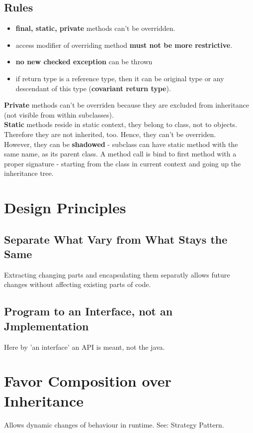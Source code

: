 \documentclass{report}
\begin{document}
\section*{Rules}
\begin{itemize}
	\item \textbf{final, static, private} methods can't be overridden.
	\item access modifier of overriding method \textbf{must not be more restrictive}.
	\item \textbf{no new checked exception} can be thrown
	\item if return type is a reference type, then it can be original type or any descendant of this type (\textbf{covariant return type}).
\end{itemize}

\textbf{Private} methods can't be overriden because they are excluded from inheritance (not visible from within subclasses). \\
\textbf{Static} methods reside in static context, they belong to class, not to objects. Therefore they are not inherited, too. Hence, they can't be overriden. \\
However, they can be \textbf{shadowed} - subclass can have static method with the same name, as its parent class. A method call is bind to first method with a proper signature - starting 
from the class in current context and going up the inheritance tree.



\chapter{Design Principles}


\section{Separate What Vary from What Stays the Same}
Extracting changing parts and encapsulating them separatly allows future changes without affecting existing parts of code.


\section{Program to an Interface, not an Jmplementation}
Here by 'an interface' an API is meant, not the java.


\chapter{Favor Composition over Inheritance}
Allows dynamic changes of behaviour in runtime. See: Strategy Pattern.
\end{document}
